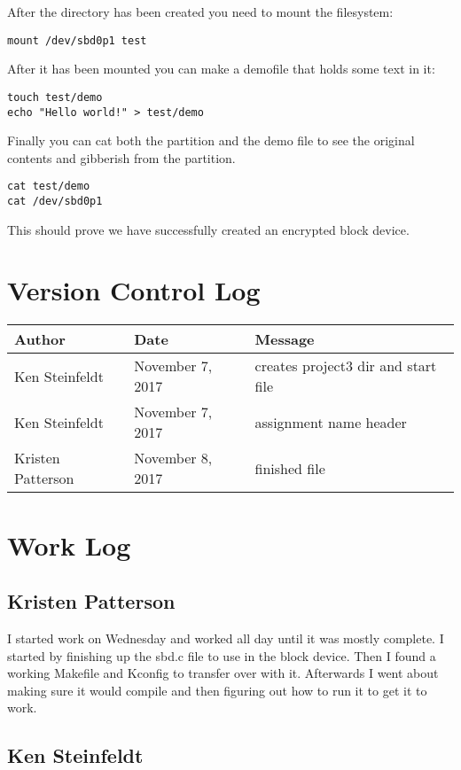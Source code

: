\documentclass[10pt,letterpaper,onecolumn,draftclsnofoot]{IEEEtran}
\begin{document}
After the directory has been created you need to mount the filesystem:

\begin{lstlisting}
mount /dev/sbd0p1 test
\end{lstlisting}

After it has been mounted you can make a demofile that holds some text in it:

\begin{lstlisting}
touch test/demo
echo "Hello world!" > test/demo
\end{lstlisting}

Finally you can cat both the partition and the demo file to see the original contents and gibberish from the partition.

\begin{lstlisting}
cat test/demo
cat /dev/sbd0p1
\end{lstlisting}

This should prove we have successfully created an encrypted block device.

\section{Version Control Log}

\begin{center}
	\begin{tabular}{|l|l|l|}
		\hline
		\textbf{Author} & \textbf{Date} & \textbf{Message} \\ \hline
		Ken Steinfeldt & November 7, 2017 & creates project3 dir and start file \\ \hline
		Ken Steinfeldt & November 7, 2017 & assignment name header \\ \hline
		Kristen Patterson & November 8, 2017 & finished file \\ \hline
	\end{tabular}
\end{center}

\section{Work Log}
\subsection{Kristen Patterson}
I started work on Wednesday and worked all day until it was mostly complete. 
I started by finishing up the sbd.c file to use in the block device.
Then I found a working Makefile and Kconfig to transfer over with it. 
Afterwards I went about making sure it would compile and then figuring out how to run it to get it to work.

\subsection{Ken Steinfeldt}
\end{document}
